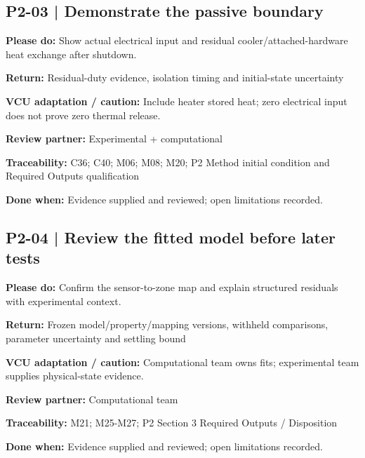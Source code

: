 \documentclass[11pt]{article}
\begin{document}
\begin{minipage}{\textwidth}\small\setlength{\parskip}{2pt}
\subsection*{P2-03 | Demonstrate the passive boundary}
\textbf{Please do:} Show actual electrical input and residual cooler/attached-hardware heat exchange after shutdown.\par
\textbf{Return:} Residual-duty evidence, isolation timing and initial-state uncertainty\par
\textbf{VCU adaptation / caution:} Include heater stored heat; zero electrical input does not prove zero thermal release.\par
\textbf{Review partner:} Experimental + computational\par
\textbf{Traceability:} C36; C40; M06; M08; M20; P2 Method initial condition and Required Outputs qualification\par
\textbf{Done when:} Evidence supplied and reviewed; open limitations recorded.\par
\end{minipage}\par\vspace{8pt}
\begin{minipage}{\textwidth}\small\setlength{\parskip}{2pt}
\subsection*{P2-04 | Review the fitted model before later tests}
\textbf{Please do:} Confirm the sensor-to-zone map and explain structured residuals with experimental context.\par
\textbf{Return:} Frozen model/property/mapping versions, withheld comparisons, parameter uncertainty and settling bound\par
\textbf{VCU adaptation / caution:} Computational team owns fits; experimental team supplies physical-state evidence.\par
\textbf{Review partner:} Computational team\par
\textbf{Traceability:} M21; M25-M27; P2 Section 3 Required Outputs / Disposition\par
\textbf{Done when:} Evidence supplied and reviewed; open limitations recorded.\par
\end{minipage}\par\vspace{8pt}
\end{document}
